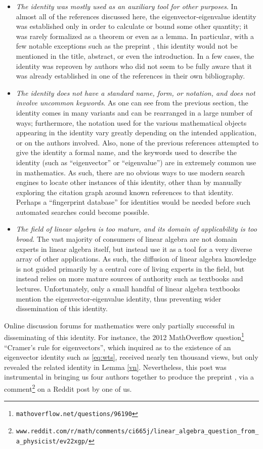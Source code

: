 \documentclass[12pt]{amsart}
\begin{document}
\begin{itemize}
\item \emph{The identity was mostly used as an auxiliary tool for other purposes}.  In almost all of the references discussed here, the eigenvector-eigenvalue identity was established only in order to calculate or bound some other quantity; it was rarely formalized as a theorem or even as a lemma.  In particular, with a few notable exceptions such as the preprint \cite{2014arXiv1401.4580V}, this identity would not be mentioned in the title, abstract, or even the introduction.  In a few cases, the identity was reproven by authors who did not seem to be fully aware that it was already established in one of the references in their own bibliography.
\item \emph{The identity does not have a standard name, form, or notation, and does not involve uncommon keywords}.  As one can see from the previous section, the identity comes in many variants and can be rearranged in a large number of ways; furthermore, the notation used for the various mathematical objects appearing in the identity vary greatly depending on the intended application, or on the authors involved.  Also, none of the previous references attempted to give the identity a formal name, and the keywords used to describe the identity (such as ``eigenvector'' or ``eigenvalue'') are in extremely common use in mathematics.  As such, there are no obvious ways to use modern search engines to locate other instances of this identity, other than by manually exploring the citation graph around known references to that identity.  Perhaps a ``fingerprint database'' for identities \cite{BT} would be needed before such automated searches could become possible.
\item \emph{The field of linear algebra is too mature, and its domain of applicability is too broad}.  The vast majority of consumers of linear algebra are not domain experts in linear algebra itself, but instead use it as a tool for a very diverse array of other applications.  As such, the diffusion of linear algebra knowledge is not guided primarily by a central core of living experts in the field, but instead relies on more mature sources of authority such as textbooks and lectures.  Unfortunately, only a small handful of linear algebra textbooks mention the eigenvector-eigenvalue identity, thus preventing wider dissemination of this identity.
\end{itemize}

Online discussion forums for mathematics were only partially successful in disseminating of this identity.  For instance, the 2012 MathOverflow question\footnote{{\tt mathoverflow.net/questions/96190}} ``Cramer's rule for eigenvectors'', which inquired as to the existence of an eigenvector identity such as \eqref{eq:wts}, received nearly ten thousand views, but only revealed the related identity in Lemma \ref{vn}.  Nevertheless, this post was instrumental in bringing us four authors together to produce the preprint \cite{DPTZ}, via a comment\footnote{{\tt www.reddit.com/r/math/comments/ci665j/linear\_algebra\_question\_from\_a\_physicist/ev22xgp/}} on a Reddit post by one of us.
\end{document}
